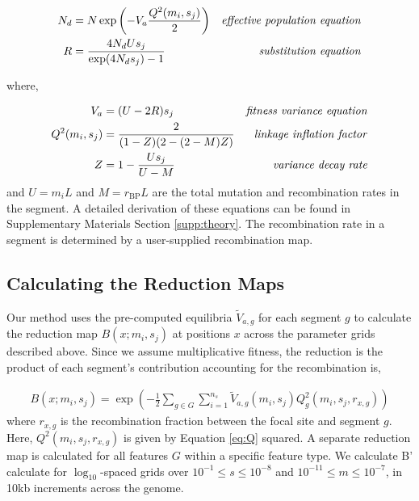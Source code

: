 \documentclass[11pt]{article}
\begin{document}
\begin{align}
  \label{eq:}
  {N}_{d} &= N \exp \left( -V_a \frac{Q^2(m_i, s_j)}{2} \right) & \text{\emph{effective population equation}} \\
  R &= \frac{4N_dU s_j}{\exp(4 N_d s_j)-1}  & \text{\emph{substitution equation}} 
\end{align}

where,

\begin{align}
  V_a &= (U - 2 R) s_j & \text{\emph{fitness variance equation}} \\
  Q^2(m_i, s_j) &= \frac{2}{(1-Z)(2-(2-M)Z)} & \text{\emph{linkage inflation factor}} \\
  Z &= 1 - \frac{Us_j}{U-{M}} & \text{\emph{variance decay rate}}
\end{align}
%
and $U = m_i L$ and $M = r_\text{BP} L$ are the total mutation and
recombination rates in the segment. A detailed derivation of these equations
can be found in Supplementary Materials Section \ref{supp:theory}. The recombination
rate in a segment is determined by a user-supplied recombination map.

\subsection*{Calculating the Reduction Maps}
\label{sec:methods-maps}

Our method uses the pre-computed equilibria $\widetilde{V}_{a,g}$ for each
segment $g$ to calculate the reduction map $B(x; m_i, s_j)$ at positions $x$
across the parameter grids described above. Since we assume multiplicative
fitness, the reduction is the product of each segment's contribution accounting
for the recombination is,

\begin{align}
    B(x; m_i, s_j) = \exp\left(- \frac{1}{2}\sum_{g \in G} \sum_{i=1}^{n_s} \widetilde{V}_{a,g}(m_i, s_j) Q_g^2(m_i, s_j, r_{x, g})\right)
\end{align}
%
where $r_{x, g}$ is the recombination fraction between the focal site and
segment $g$. Here, $Q^2(m_i, s_j, r_{x,g})$ is given by Equation \eqref{eq:Q}
squared. A separate reduction map is calculated for all features $G$ within a
specific feature type. We calculate B' calculate for $\log_{10}$-spaced grids
over $10^{-1} \le s \le 10^{-8}$ and $10^{-11} \le m \le 10^{-7}$, in 10kb
increments across the genome.
\end{document}
